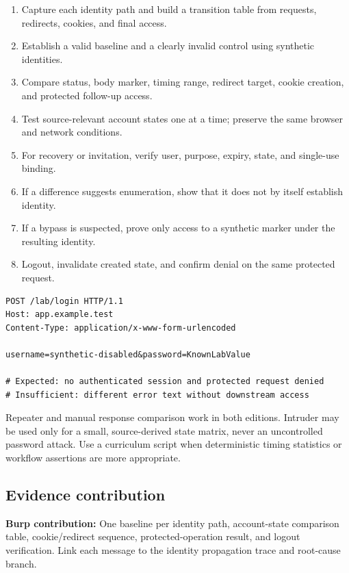 \documentclass[11pt]{article}
\newcommand{\weekfield}[2]{%
  \Needspace{5\baselineskip}
  \subsection*{#1}
  #2
}
\newcommand{\burpevidence}[1]{\textbf{Burp contribution:} #1}
\begin{document}
\begin{procedurebox}
\begin{enumerate}
  \item Capture each identity path and build a transition table from requests, redirects, cookies, and final access.
  \item Establish a valid baseline and a clearly invalid control using synthetic identities.
  \item Compare status, body marker, timing range, redirect target, cookie creation, and protected follow-up access.
  \item Test source-relevant account states one at a time; preserve the same browser and network conditions.
  \item For recovery or invitation, verify user, purpose, expiry, state, and single-use binding.
  \item If a difference suggests enumeration, show that it does not by itself establish identity.
  \item If a bypass is suspected, prove only access to a synthetic marker under the resulting identity.
  \item Logout, invalidate created state, and confirm denial on the same protected request.
\end{enumerate}
\end{procedurebox}

\begin{lstlisting}[caption={Authentication state comparison}]
POST /lab/login HTTP/1.1
Host: app.example.test
Content-Type: application/x-www-form-urlencoded

username=synthetic-disabled&password=KnownLabValue

# Expected: no authenticated session and protected request denied
# Insufficient: different error text without downstream access
\end{lstlisting}

\begin{editionbox}
Repeater and manual response comparison work in both editions. Intruder may be
used only for a small, source-derived state matrix, never an uncontrolled
password attack. Use a curriculum script when deterministic timing statistics
or workflow assertions are more appropriate.
\end{editionbox}

\weekfield{Evidence contribution}{\burpevidence{One baseline per identity path,
account-state comparison table, cookie/redirect sequence, protected-operation
result, and logout verification.} Link each message to the identity propagation
trace and root-cause branch.}
\end{document}
